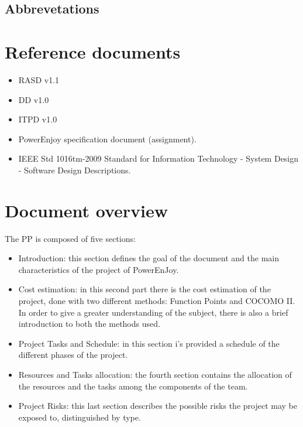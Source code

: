 \subsection{Abbrevetations}

\section{Reference documents}

\begin{itemize}
\item RASD v1.1
\item DD v1.0
\item ITPD v1.0
\item PowerEnjoy specification document (assignment).
\item IEEE Std 1016tm-2009 Standard for Information Technology - System Design - Software Design Descriptions.
\end{itemize}

\section{Document overview}
The PP is composed of five sections:
\begin{itemize}
\item Introduction: this section defines the goal of the document and the main characteristics of the project of PowerEnJoy.
\item Cost estimation: in this second part there is the cost estimation of the project, done with two different methods: Function Points and COCOMO II. In order to give a greater understanding of the subject, there is also a brief introduction to both the methods used.
\item Project Tasks and Schedule: in this section i’s provided a schedule of the different phases of the project.
\item Resources and Tasks allocation: the fourth section contains the allocation of the resources and the tasks among the components of the team.
\item Project Risks: this last section describes the possible risks the project may be exposed to, distinguished by type.
\end{itemize}
